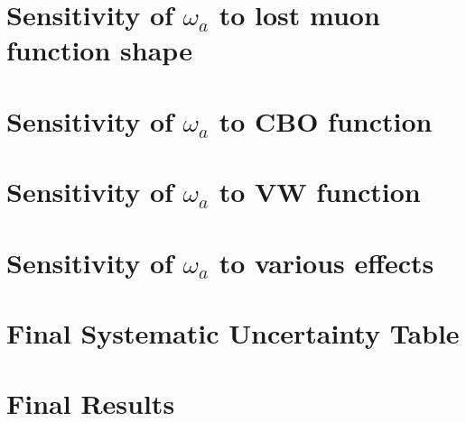 \section{Sensitivity of \texorpdfstring{$\omega_{a}$}{} to lost muon function shape}

\section{Sensitivity of \texorpdfstring{$\omega_{a}$}{} to CBO function}

\section{Sensitivity of \texorpdfstring{$\omega_{a}$}{} to VW function}

\section{Sensitivity of \texorpdfstring{$\omega_{a}$}{} to various effects}

\section{Final Systematic Uncertainty Table}

\section{Final Results}
